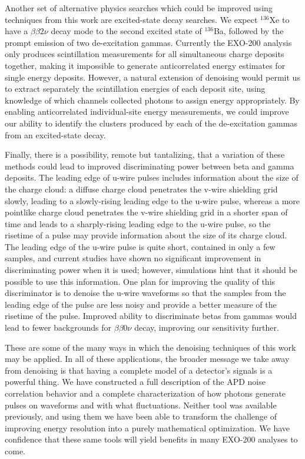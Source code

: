 Another set of alternative physics searches which could be improved using techniques from this work are excited-state decay searches.  We expect $^{136}$Xe to have a $\beta\beta 2\nu$ decay mode to the second excited state of $^{136}$Ba, followed by the prompt emission of two de-excitation gammas.  Currently the EXO-200 analysis only produces scintillation measurements for all simultaneous charge deposits together, making it impossible to generate anticorrelated energy estimates for single energy deposits.  However, a natural extension of denoising would permit us to extract separately the scintillation energies of each deposit site, using knowledge of which channels collected photons to assign energy appropriately.  By enabling anticorrelated individual-site energy measurements, we could improve our ability to identify the clusters produced by each of the de-excitation gammas from an excited-state decay.

Finally, there is a possibility, remote but tantalizing, that a variation of these methods could lead to improved discriminating power between beta and gamma deposits.  The leading edge of u-wire pulses includes information about the size of the charge cloud: a diffuse charge cloud penetrates the v-wire shielding grid slowly, leading to a slowly-rising leading edge to the u-wire pulse, whereas a more pointlike charge cloud penetrates the v-wire shielding grid in a shorter span of time and leads to a sharply-rising leading edge to the u-wire pulse, so the risetime of a pulse may provide information about the size of its charge cloud.  The leading edge of the u-wire pulse is quite short, contained in only a few samples, and current studies have shown no significant improvement in discriminating power when it is used; however, simulations hint that it should be possible to use this information.  One plan for improving the quality of this discriminator is to denoise the u-wire waveforms so that the samples from the leading edge of the pulse are less noisy and provide a better measure of the risetime of the pulse.  Improved ability to discriminate betas from gammas would lead to fewer backgrounds for $\beta\beta 0\nu$ decay, improving our sensitivity further.

These are some of the many ways in which the denoising techniques of this work may be applied.  In all of these applications, the broader message we take away from denoising is that having a complete model of a detector's signals is a powerful thing.  We have constructed a full description of the APD noise correlation behavior and a complete characterization of how photons generate pulses on waveforms and with what fluctuations.  Neither tool was available previously, and using them we have been able to transform the challenge of improving energy resolution into a purely mathematical optimization.    We have confidence that these same tools will yield benefits in many EXO-200 analyses to come.


